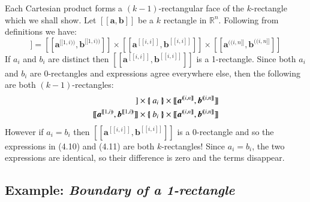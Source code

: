 Each Cartesian product forms a $(k-1)$-rectangular face of the $k$-rectangle which we shall show.
Let $[\![ \boldsymbol{a}, \boldsymbol{b} ]\!]$ be a $k$ rectangle in $\mathbb{R}^n$.
Following from definitions we have:
\begin{equation}
	[\![ \boldsymbol{a}, \boldsymbol{b} ]\!] = 
		[\![\boldsymbol{a}^{[\![1,i)\!)}, \boldsymbol{b}^{[\![1,i)\!)} ]\!] \times 
		[\![\boldsymbol{a}^{[\![i,i]\!]}, \boldsymbol{b}^{[\![i,i]\!]} ]\!] \times
		[\![\boldsymbol{a}^{(\!(i,n]\!]}, \boldsymbol{b}^{(\!(i,n]\!]} ]\!]
\end{equation}
If $a_i$ and $b_i$ are distinct then $[\![\boldsymbol{a}^{[\![i,i]\!]}, \boldsymbol{b}^{[\![i,i]\!]} ]\!]$ is a 1-rectangle.
Since both $a_i$ and $b_i$ are 0-rectangles and expressions agree everywhere else, then the following are both $(k-1)$-rectangles:
\begin{align}
	[\![\boldsymbol{a}^{[\![1,i)\!)}, \boldsymbol{b}^{[\![1,i)\!)} ]\!]
	\times \hset{a_i} \times
	[\![\boldsymbol{a}^{(\!(i,n]\!]}, \boldsymbol{b}^{(\!(i,n]\!]} ]\!]
	\\
	[\![\boldsymbol{a}^{[\![1,i)\!)}, \boldsymbol{b}^{[\![1,i)\!)} ]\!]
	\times \hset{b_i} \times
	[\![\boldsymbol{a}^{(\!(i,n]\!]}, \boldsymbol{b}^{(\!(i,n]\!]} ]\!]
\end{align}
However if $a_i = b_i$ then $[\![\boldsymbol{a}^{[\![i,i]\!]}, \boldsymbol{b}^{[\![i,i]\!]} ]\!]$ is a 0-rectangle and so the expressions in (4.10) and (4.11) are both $k$-rectangles!
Since $a_i = b_i$, the two expressions are identical, so their difference is zero and the terms disappear.

\subsection{Example: \emph{Boundary of a 1-rectangle}}

